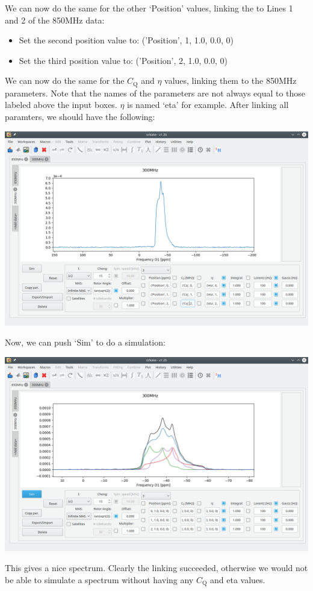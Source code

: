 \documentclass[11pt,a4paper]{article}
\begin{document}
We can now do the same for the other `Position' values, linking the to Lines 1 and 2 of the 850MHz
data:
\begin{itemize}
  \item Set the second position value to: ('Position', 1, 1.0, 0.0, 0)
  \item Set the third position value to: ('Position', 2, 1.0, 0.0, 0)
\end{itemize}

We can now do the same for the $C_\text{Q}$ and $\eta$ values, linking them to the 850MHz
parameters. Note that the names of the parameters are not always equal to those labeled above the
input boxes. $\eta$ is named `eta' for example. After linking all paramters, we should have the
following:
\begin{center}
\includegraphics[width=1.0\linewidth]{Figs/Fig11.png}
\end{center}
Now, we can push `Sim' to do a simulation:
\begin{center}
\includegraphics[width=1.0\linewidth]{Figs/Fig12.png}
\end{center}
This gives a nice spectrum. Clearly the linking succeeded, otherwise we would not be able to simulate
a spectrum without having any $C_\text{Q}$ and eta values.
\end{document}
